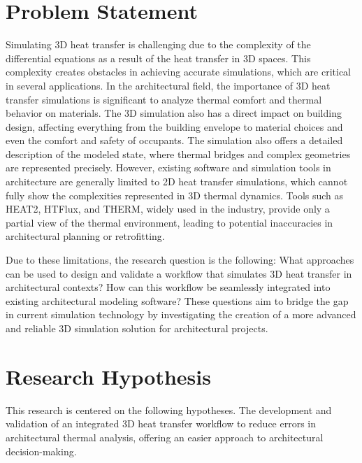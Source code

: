 \section{Problem Statement}
Simulating 3D heat transfer is challenging due to the complexity of the differential equations as a result of the heat transfer in 3D spaces. 
This complexity creates obstacles in achieving accurate simulations, which are critical in several applications. In the architectural field, the importance of 3D heat transfer simulations is significant to analyze thermal comfort and thermal behavior on materials. The 3D simulation also has a direct impact on building design, affecting everything from the building envelope to material choices and even the comfort and safety of occupants. The simulation also offers a detailed description of the modeled state, where thermal bridges and complex geometries are represented precisely.
However, existing software and simulation tools in architecture are generally limited to 2D heat transfer simulations, which cannot fully show the complexities represented in 3D thermal dynamics. Tools such as HEAT2, HTFlux, and THERM, widely used in the industry, provide only a partial view of the thermal environment, leading to potential inaccuracies in architectural planning or retrofitting.

Due to these limitations, the research question is the following: What approaches can be used to design and validate a workflow that simulates 3D heat transfer in architectural contexts? How can this workflow be seamlessly integrated into existing architectural modeling software? These questions aim to bridge the gap in current simulation technology by investigating the creation of a more advanced and reliable 3D simulation solution for architectural projects.

\section{Research Hypothesis}
This research is centered on the following hypotheses.
The development and validation of an integrated 3D heat transfer workflow to reduce errors in architectural thermal analysis, offering an easier approach to architectural decision-making.

